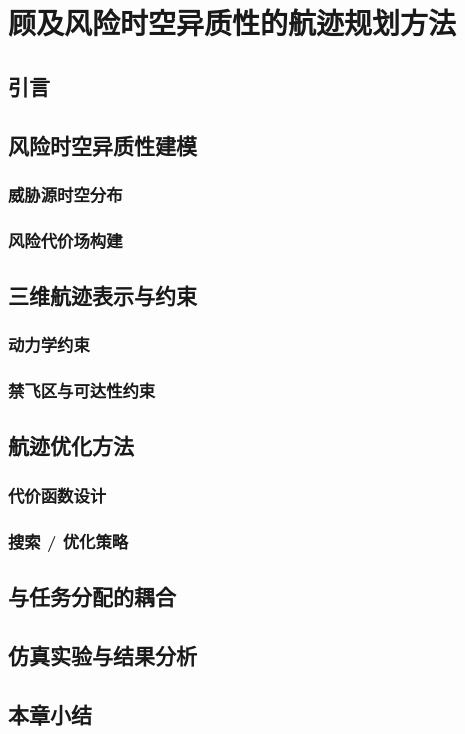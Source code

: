 \chapter{顾及风险时空异质性的航迹规划方法}

\section{引言}

\section{风险时空异质性建模}
\subsection{威胁源时空分布}
\subsection{风险代价场构建}

\section{三维航迹表示与约束}
\subsection{动力学约束}
\subsection{禁飞区与可达性约束}

\section{航迹优化方法}
\subsection{代价函数设计}
\subsection{搜索 / 优化策略}

\section{与任务分配的耦合}

\section{仿真实验与结果分析}

\section{本章小结}
